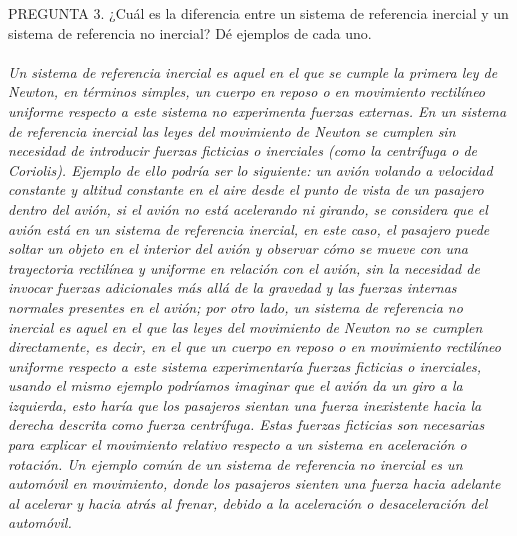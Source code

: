 \documentclass{article}
\begin{document}
PREGUNTA 3. ¿Cuál es la diferencia entre un sistema de referencia inercial y un sistema de referencia no inercial? Dé ejemplos de cada uno. \\\\
\textit{Un sistema de referencia inercial es aquel en el que se cumple la primera ley de Newton, en términos simples, un cuerpo en reposo o en movimiento rectilíneo uniforme respecto a este sistema no experimenta fuerzas externas. En un sistema de referencia inercial las leyes del movimiento de Newton se cumplen sin necesidad de introducir fuerzas ficticias o inerciales (como la centrífuga o de Coriolis). Ejemplo de ello podría ser lo siguiente: un avión volando a velocidad constante y altitud constante en el aire desde el punto de vista de un pasajero dentro del avión, si el avión no está acelerando ni girando, se considera que el avión está en un sistema de referencia inercial, en este caso, el pasajero puede soltar un objeto en el interior del avión y observar cómo se mueve con una trayectoria rectilínea y uniforme en relación con el avión, sin la necesidad de invocar fuerzas adicionales más allá de la gravedad y las fuerzas internas normales presentes en el avión; por otro lado, un sistema de referencia no inercial es aquel en el que las leyes del movimiento de Newton no se cumplen directamente, es decir, en el que un cuerpo en reposo o en movimiento rectilíneo uniforme respecto a este sistema experimentaría fuerzas ficticias o inerciales, usando el mismo ejemplo podríamos imaginar que el avión da un giro a la izquierda, esto haría que los pasajeros sientan una fuerza inexistente hacia la derecha descrita como fuerza centrífuga. Estas fuerzas ficticias son necesarias para explicar el movimiento relativo respecto a un sistema en aceleración o rotación. Un ejemplo común de un sistema de referencia no inercial es un automóvil en movimiento, donde los pasajeros sienten una fuerza hacia adelante al acelerar y hacia atrás al frenar, debido a la aceleración o desaceleración del automóvil.}
\\\\
\end{document}

